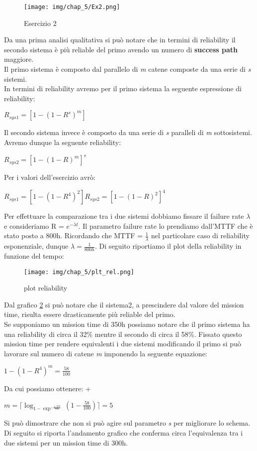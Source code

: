 \begin{figure}[H]
    \centering
    \texttt{[image: img/chap\_5/Ex2.png]}
    \caption{Esercizio 2}
    \label{fig:Ex_2}
\end{figure}
\noindent
Da una prima analisi qualitativa si può notare che in termini di reliability il secondo sistema è più reliable del primo avendo un numero di \textbf{success path} maggiore.\\
Il primo sistema è composto dal parallelo di \textit{m} catene composte da una serie di \textit{s} sistemi.\\
In termini di reliability avremo per il primo sistema la seguente espressione di reliability:
\begin{center}
    $
        R_{sys1} = [1-(1-R^s)^m]
    $
\end{center}
Il secondo sistema invece è composto da una serie di \textit{s} paralleli di \textit{m} sottosistemi.\\
Avremo dunque la seguente reliability:
\begin{center}
    $
        R_{sys2} = [1-(1-R)^m]^s
    $
\end{center}
Per i valori dell'esercizio avrò:
\begin{center}
    $
    R_{sys1} = [1-(1-R^4)^2] 
    R_{sys2} = [1-(1-R)^2]^4 
    $
\end{center}
Per effettuare la comparazione tra i due sistemi dobbiamo fissare il failure rate $\lambda$ e consideriamo R = $e^{-\lambda t}$.
Il parametro failure rate lo prendiamo dall'MTTF che è stato posto a 800h.
Ricordando che MTTF = $\frac{1}{\lambda}$ nel particolare caso di reliability esponenziale, dunque $\lambda = \frac{1}{800h}$. 
Di seguito riportiamo il plot della reliability in funzione del tempo:

\begin{figure}[H]
    \centering
    \texttt{[image: img/chap\_5/plt\_rel.png]}
    \caption{plot reliability}
    \label{fig:plt_rel}
\end{figure}
\noindent
Dal grafico \ref{fig:plt_rel} si può notare che il sistema2, a prescindere dal valore del mission time, risulta essere drasticamente più reliable del primo.\\
Se supponiamo un mission time di 350h possiamo notare che il primo sistema ha una reliability di circa il 32\% mentre il secondo di circa il 58\%.
Fissato questo mission time per rendere equivalenti i due sistemi modificando il primo si può lavorare sul numero di catene \textit{m} imponendo la seguente equazione:
\begin{center}
    $
    1-(1-R^4)^m = \frac{58}{100}
    $
\end{center}
Da cui possiamo ottenere: 
+\begin{center}
    $
    m = \lceil \log_{1-\exp^{-\frac{4 \cdot 350}{800}}}(1-\frac{58}{100})\rceil = 5
    $
\end{center}
Si può dimostrare che non si può agire sul parametro \textit{s} per migliorare lo schema.\\
Di seguito si riporta l'andamento grafico che conferma circa l'equivalenza tra i due sistemi per un mission time di 300h. 

